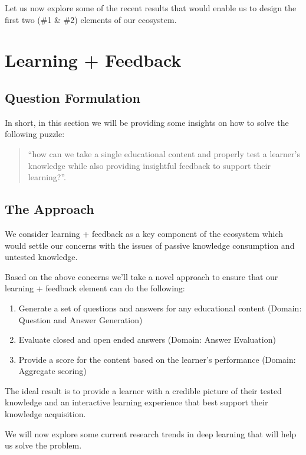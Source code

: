\documentclass{acm_proc_article-sp}
\begin{document}
Let us now explore some of the recent results that would enable us to
design the first two (\#1 \& \#2) elements of our ecosystem.

\section{Learning + Feedback}\label{learning-feedback}

\subsection{Question Formulation}\label{question-formulation}

In short, in this section we will be providing some insights on how to
solve the following puzzle:

\begin{quote}
``how can we take a single educational content and properly test a
learner's knowledge while also providing insightful feedback to support
their learning?''.
\end{quote}

\subsection{The Approach}\label{the-approach}

We consider learning + feedback as a key component of the ecosystem
which would settle our concerns with the issues of passive knowledge
consumption and untested knowledge.

Based on the above concerns we'll take a novel approach to ensure that
our learning + feedback element can do the following:

\begin{enumerate}
\def\labelenumi{\arabic{enumi}.}
\item
  Generate a set of questions and answers for any educational content
  (Domain: Question and Answer Generation)
\item
  Evaluate closed and open ended answers (Domain: Answer Evaluation)
\item
  Provide a score for the content based on the learner's performance
  (Domain: Aggregate scoring)
\end{enumerate}

The ideal result is to provide a learner with a credible picture of
their tested knowledge and an interactive learning experience that best
support their knowledge acquisition.

We will now explore some current research trends in deep learning that
will help us solve the problem.
\end{document}
